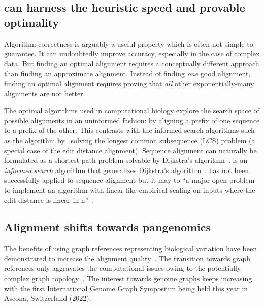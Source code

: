 \subsection*{\A can harness the heuristic speed and provable optimality}

Algorithm correctness is arguably a useful property which is often not simple to
guarantee. It can undoubtedly improve accuracy, especially in the case of
complex data. But finding an optimal alignment requires a conceptually different
approach than finding an approximate alignment. Instead of finding \emph{one}
good alignment, finding an optimal alignment requires proving that \emph{all}
other exponentially-many alignments are not better.

The optimal algorithms used in computational biology explore the search space of
possible alignments in an uninformed fashion: by aligning a prefix of one
sequence to a prefix of the other. This contrasts with the informed search
algorithms such as the algorithm by~\citet{hunt1977fast} solving the longest
common subsequence (LCS) problem (a special case of the edit distance
alignment). Sequence alignment can naturally be formulated as a shortest path
problem solvable by Dijkstra's algorithm~\citep{ukkonen1985algorithms}. \A is an
\emph{informed search} algorithm that generalizes Dijkstra's
algorithm~\citep{hart1968formal}. \A has not been successfully applied to
sequence alignment but it may to “a major open problem to implement an algorithm
with linear-like empirical scaling on inputs where the edit distance is linear
in n”~\citep{medvedev2022theoretical}.

\subsection*{Alignment shifts towards pangenomics}

The benefits of using graph references representing biological variation have
been demonstrated to increase the alignment
quality~\citep{garrison_variation_2018}. The transition towards graph references
only aggravates the computational issues owing to the potentially complex graph
topology~\citep{equi_complexity_2019}. The interest towards genome graphs keeps
increasing with the first International Genome Graph Symposium being held this
year in Ascona, Switzerland (2022).
